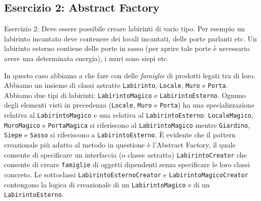 \documentclass{article}
\begin{document}
\subsection{Esercizio 2: Abstract Factory}
\begin{framed}
Esercizio 2: Deve essere possibile creare labirinti di vario tipo. Per esempio un labirinto incantato deve contenere dei locali incantati, delle porte parlanti etc. Un labirinto esterno contiene delle porte in sasso (per aprire tale porte \`e necessario avere una determinata energia), i muri sono siepi etc.
\end{framed}
In questo caso abbiamo a che fare con delle \emph{famiglie} di prodotti legati tra di loro. Abbiamo un insieme di classi astratte \texttt{Labirinto}, \texttt{Locale}, \texttt{Muro} e \texttt{Porta}. Abbiamo due tipi di labirinti: \texttt{LabirintoMagico} e \texttt{LabirintoEsterno}. Ognuno degli elementi visti in precedenza (\texttt{Locale}, \texttt{Muro} e \texttt{Porta}) ha una specializzazione relativa al \texttt{LabirintoMagico} e una relativa al \texttt{LabirintoEsterno}: \texttt{LocaleMagico}, \texttt{MuroMagico} e \texttt{PortaMagica} si riferiscono al \texttt{LabirintoMagico} mentre \texttt{Giardino}, \texttt{Siepe} e \texttt{Sasso} si riferiscono a \texttt{LabirintoEsterno}. \`E evidente che il pattern creazionale pi\`u adatto al metodo in questione \`e l'Abstract Factory, il quale consente di specificare un interfaccia (o classe astratta) \texttt{LabirintoCreator} che consente di creare  \texttt{famiglie} di oggetti dipendenti senza specificare le loro classi concreto. Le sottoclassi \texttt{LabirintoEsternoCreator} e \texttt{LabirintoMagicoCreator} contengono la logica di creazionale di un  \texttt{LabirintoMagico} e di un \texttt{LabirintoEsterno}.
\end{document}
